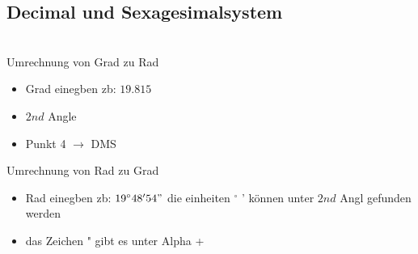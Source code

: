 \newpage
\subsection{Decimal und Sexagesimalsystem}

\hfill \break
\fboxrule=0.8pt \\


\hfill \break
Umrechnung von Grad zu Rad
\begin{itemize}
    \item Grad einegben zb: $19.815$
    \item $2nd$ Angle
    \item Punkt 4 $\rightarrow$ DMS
\end{itemize}

\hfill \break
Umrechnung von Rad zu Grad
\begin{itemize}
    \item Rad einegben zb: $19^{\circ}48'54"$ die einheiten $^{\circ}$ ' können unter $2nd$ Angl gefunden werden
    \item das Zeichen " gibt es unter Alpha +
\end{itemize}

